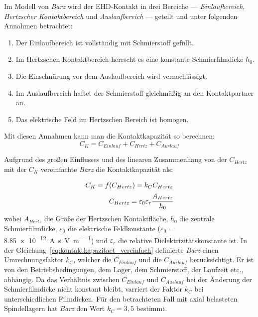 Im Modell von \textit{Barz} wird der EHD-Kontakt in drei Bereiche --- \textit{Einlaufbereich}, \textit{Hertzscher Kontaktbereich} und \textit{Auslaufbereich} --- geteilt und unter folgenden Annahmen betrachtet:
\begin{enumerate}
    \item Der Einlaufbereich ist vollständig mit Schmierstoff gefüllt.
    \item Im Hertzschen Kontaktbereich herrscht es eine konstante Schmierfilmdicke $h_0$.
    \item Die Einschnürung vor dem Auslaufbereich wird vernachlässigt.
    \item Im Auslaufbereich haftet der Schmierstoff gleichmäßig an den Kontaktpartner an.
    \item Das elektrische Feld im Hertzschen Bereich ist homogen.
\end{enumerate}

Mit diesen Annahmen kann man die Kontaktkapazität so berechnen:
\begin{equation}
    C_K = C_{Einlauf} + C_{Hertz} + C_{Auslauf}
    \label{eq:kontaktkapazitaet}
\end{equation}

Aufgrund des großen Einflusses und des linearen Zusammenhang von der $C_{Hertz}$ mit der $C_K$ vereinfachte \textit{Barz} die Kontaktkapazität als:

\begin{align}
    C_K = f(C_{Hertz}) = k_C C_{Hertz} \\
    C_{Hertz} = \varepsilon_0 \varepsilon_r \cfrac{A_{Hertz}}{h_0}
    \label{eq:kontaktkapazitaet_vereinfach}
\end{align}
%
wobei $A_{Hertz}$ die Größe der Hertzschen Kontaktfläche, $h_0$ die zentrale Schmierfilmdicke, $\varepsilon_0$ die elektrische Feldkonstante ($\varepsilon_0 =$ \SI[bracket-unit-denominator=false, per-mode=symbol]{8,85e-12}{\ampere\second\per\volt\per\meter}) und $\varepsilon_r$ die relative Dielektrizitätskonstante ist.
In der Gleichung~\ref{eq:kontaktkapazitaet_vereinfach} definierte \textit{Barz} einen Umrechnungsfaktor $k_C$, welcher die $C_{Einlauf}$ und die $C_{Auslauf}$ berücksichtigt.
Er ist von den Betriebsbedingungen, dem Lager, dem Schmierstoff, der Laufzeit etc., abhängig.
Da das Verhältnis zwischen $C_{Einlauf}$ und $C_{Auslauf}$ bei der Änderung der Schmierfilmdicke nicht konstant bleibt, varriert der Faktor $k_C$ bei unterschiedlichen Filmdicken.
Für den betrachteten Fall mit axial belasteten Spindellagern hat \textit{Barz} den Wert $k_C = 3,5$ bestimmt.

